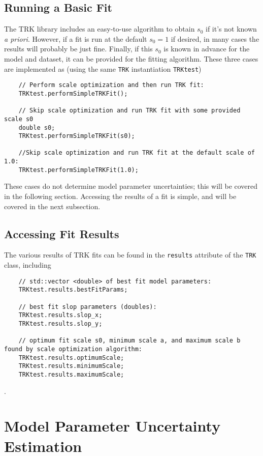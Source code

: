 \documentclass[12pt]{article}
\newcommand{\li}{\lstinline}
\begin{document}
\subsection{Running a Basic Fit}
The TRK library includes an easy-to-use algorithm to obtain $s_0$ if it's not known \textit{a priori}. However, if a fit is run at the default $s_0=1$ if desired, in many cases the results will probably be just fine. Finally, if this $s_0$ is known in advance for the model and dataset, it can be provided for the fitting algorithm. These three cases are implemented as (using the same \li{TRK} instantiation \li{TRKtest})
\begin{lstlisting}
    // Perform scale optimization and then run TRK fit:
    TRKtest.performSimpleTRKFit();
    
    // Skip scale optimization and run TRK fit with some provided scale s0
    double s0;
    TRKtest.performSimpleTRKFit(s0);
    
    //Skip scale optimization and run TRK fit at the default scale of 1.0:
    TRKtest.performSimpleTRKFit(1.0);
\end{lstlisting}

These cases do not determine model parameter uncertainties; this will be covered in the following section. Accessing the results of a fit is simple, and will be covered in the next subsection.

\subsection{Accessing Fit Results}

The various results of TRK fits can be found in the \li{results} attribute of the \li{TRK} class, including

\begin{lstlisting}
    // std::vector <double> of best fit model parameters:
    TRKtest.results.bestFitParams;
    
    // best fit slop parameters (doubles):
    TRKtest.results.slop_x;
    TRKtest.results.slop_y;
    
    // optimum fit scale s0, minimum scale a, and maximum scale b found by scale optimization algorithm:
    TRKtest.results.optimumScale;
    TRKtest.results.minimumScale;
    TRKtest.results.maximumScale;
\end{lstlisting}.

\section{Model Parameter Uncertainty Estimation}
\end{document}
